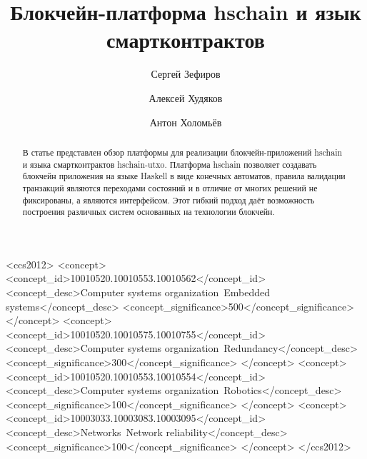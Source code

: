 \documentclass[acmlarge,screen]{acmart}
\begin{document}
%
\title{Блокчейн-платформа hschain и язык смартконтрактов}

%
\author{Сергей Зефиров}

\author{Алексей Худяков}

\author{Антон Холомьёв}


%
\renewcommand{\shortauthors}{Trovato and Tobin, et al.}

%
\begin{abstract}
В статье представлен обзор платформы для реализации блокчейн-приложений hschain и языка
смартконтрактов hschain-utxo. Платформа hschain позволяет создавать блокчейн приложения
на языке Haskell в виде конечных автоматов, правила валидации транзакций
являются переходами состояний и в отличие от многих решений не фиксированы,
а являются интерфейсом. Этот гибкий подход даёт возможность построения различных систем
основанных на технологии блокчейн.
\end{abstract}

%
%
\begin{CCSXML}
<ccs2012>
 <concept>
  <concept_id>10010520.10010553.10010562</concept_id>
  <concept_desc>Computer systems organization~Embedded systems</concept_desc>
  <concept_significance>500</concept_significance>
 </concept>
 <concept>
  <concept_id>10010520.10010575.10010755</concept_id>
  <concept_desc>Computer systems organization~Redundancy</concept_desc>
  <concept_significance>300</concept_significance>
 </concept>
 <concept>
  <concept_id>10010520.10010553.10010554</concept_id>
  <concept_desc>Computer systems organization~Robotics</concept_desc>
  <concept_significance>100</concept_significance>
 </concept>
 <concept>
  <concept_id>10003033.10003083.10003095</concept_id>
  <concept_desc>Networks~Network reliability</concept_desc>
  <concept_significance>100</concept_significance>
 </concept>
</ccs2012>
\end{CCSXML}
\end{document}
